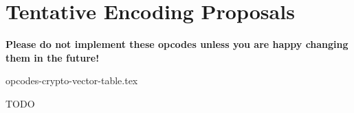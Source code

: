 
\newpage
\section{Tentative Encoding Proposals}

{\bf Please do not implement these opcodes unless you are happy changing
them in the future!}
\medskip

{opcodes-crypto-vector-table.tex}

TODO

